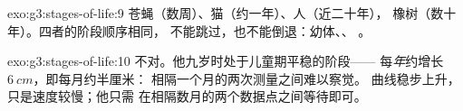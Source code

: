 \begin{solution}{exo:g3:stages-of-life:9}
苍蝇（数周）、猫（约一年）、人（近二十年），
橡树（数十年）。四者的阶段顺序相同，
不能跳过，也不能倒退：幼体、、
。
\end{solution}

\begin{solution}{exo:g3:stages-of-life:10}
不对。他九岁时处于儿童期平稳的阶段——
每\emph{年}约增长 $\qty{6}{cm}$，即每月约半厘米：
相隔一个月的两次测量之间难以察觉。
曲线稳步上升，只是速度较慢；他只需
在相隔数月的两个数据点之间等待即可。
\end{solution}
